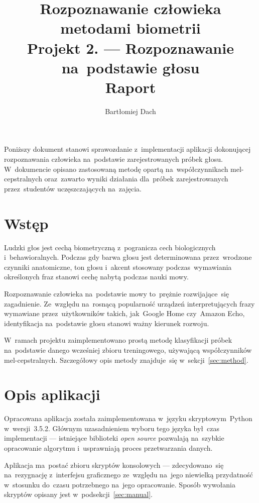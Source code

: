 \documentclass[11pt,a4paper]{article}
\begin{document}
\title{Rozpoznawanie człowieka metodami biometrii \\
\Large{
    Projekt 2. --- Rozpoznawanie na~podstawie głosu \\
    Raport
}}
\author{Bartłomiej Dach}
\maketitle

Poniższy dokument stanowi sprawozdanie z~implementacji aplikacji dokonującej rozpoznawania człowieka na~podstawie zarejestrowanych próbek głosu.
W~dokumencie opisano zastosowaną metodę opartą na~współczynnikach mel-cepstralnych oraz~zawarto wyniki działania dla~próbek zarejestrowanych przez~studentów uczęszczających na~zajęcia.

\section{Wstęp}

Ludzki głos jest cechą biometryczną z~pogranicza cech biologicznych i~behawioralnych.
Podczas gdy barwa głosu jest determinowana przez~wrodzone czynniki anatomiczne, ton głosu i~akcent stosowany podczas~wymawiania określonych fraz stanowi cechę nabytą podczas nauki mowy.

Rozpoznawanie człowieka na~podstawie mowy to~prężnie rozwijające~się zagadnienie.
Ze~względu na~rosnącą popularność urządzeń interpretujących frazy wymawiane przez~użytkowników takich, jak~Google Home czy~Amazon Echo, identyfikacja na~podstawie głosu stanowi ważny kierunek rozwoju.

W~ramach projektu zaimplementowano prostą metodę klasyfikacji próbek na~podstawie danego wcześniej zbioru treningowego, używającą współczynników mel-cepstralnych.
Szczegółowy opis metody znajduje~się w~sekcji~\ref{sec:method}.

\section{Opis aplikacji}

Opracowana aplikacja została zaimplementowana w~języku skryptowym~Python w~wersji~3.5.2.
Głównym uzasadnieniem wyboru tego języka był~czas implementacji --- istniejące biblioteki \emph{open source} pozwalają na~szybkie opracowanie algorytmu i~usprawniają proces przetwarzania danych.

Aplikacja ma~postać zbioru skryptów konsolowych --- zdecydowano~się na~rezygnację z~interfejsu graficznego ze~względu na~jego niewielką przydatność w~stosunku do~czasu potrzebnego na~jego opracowanie.
Sposób wywołania skryptów opisany jest w~podsekcji~\ref{sec:manual}.
\end{document}
